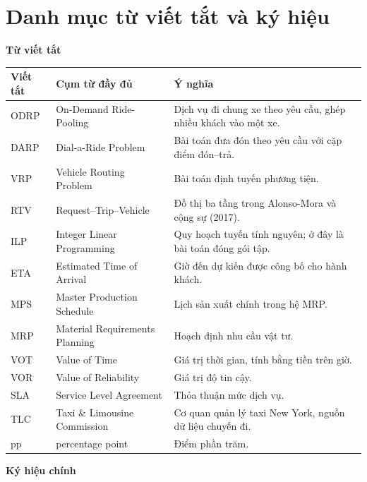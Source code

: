 \chapter*{Danh mục từ viết tắt và ký hiệu}

\vspace{4pt}
\noindent\textbf{Từ viết tắt}
\vspace{4pt}

\begin{longtable}{@{}p{2.6cm}p{4.6cm}p{7.6cm}@{}}
\toprule
\textbf{Viết tắt} & \textbf{Cụm từ đầy đủ} & \textbf{Ý nghĩa}\\
\midrule
\endhead
ODRP & On-Demand Ride-Pooling & Dịch vụ đi chung xe theo yêu cầu, ghép nhiều khách vào một xe.\\
DARP & Dial-a-Ride Problem & Bài toán đưa đón theo yêu cầu với cặp điểm đón--trả.\\
VRP & Vehicle Routing Problem & Bài toán định tuyến phương tiện.\\
RTV & Request--Trip--Vehicle & Đồ thị ba tầng trong Alonso-Mora và cộng sự (2017).\\
ILP & Integer Linear Programming & Quy hoạch tuyến tính nguyên; ở đây là bài toán đóng gói tập.\\
ETA & Estimated Time of Arrival & Giờ đến dự kiến được công bố cho hành khách.\\
MPS & Master Production Schedule & Lịch sản xuất chính trong hệ MRP.\\
MRP & Material Requirements Planning & Hoạch định nhu cầu vật tư.\\
VOT & Value of Time & Giá trị thời gian, tính bằng tiền trên giờ.\\
VOR & Value of Reliability & Giá trị độ tin cậy.\\
SLA & Service Level Agreement & Thỏa thuận mức dịch vụ.\\
TLC & Taxi \& Limousine Commission & Cơ quan quản lý taxi New York, nguồn dữ liệu chuyến đi.\\
pp & percentage point & Điểm phần trăm.\\
\bottomrule
\end{longtable}

\vspace{8pt}
\noindent\textbf{Ký hiệu chính}
\vspace{4pt}

